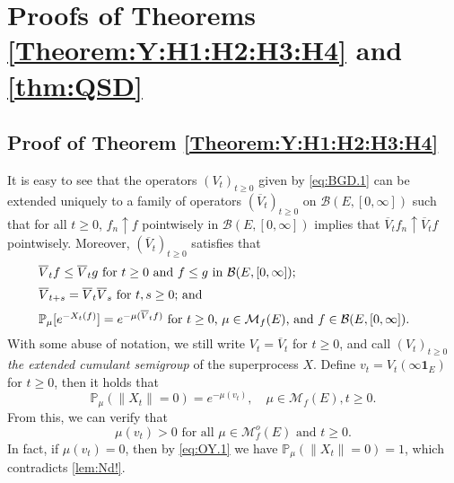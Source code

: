 \documentclass[12pt,a4paper]{amsart}
\numberwithin{equation}{section}
\theoremstyle{plain}
\theoremstyle{definition}
\theoremstyle{remark}
\begin{document}
\section{Proofs of Theorems \ref{Theorem:Y:H1:H2:H3:H4} and \ref{thm:QSD}} \label{sec:proofof thms}

\subsection{Proof of Theorem \ref{Theorem:Y:H1:H2:H3:H4}} \label{subsec:OY}
	It is easy to see that the operators $(V_t)_{t\geq 0}$
	given by \eqref{eq:BGD.1} can be extended uniquely to a family of operators $(\overline V_t)_{t\geq 0}$ on $\mathcal B(E,[0,\infty])$ such that for all $t\geq 0$, $f_n \uparrow f$ pointwisely in  $\mathcal B(E, [0,\infty])$ implies that $\overline V_tf_n \uparrow \overline V_tf$ pointwisely.
	Moreover, $(\overline V_t)_{t\geq 0}$ satisfies that
\begin{equation}
\begin{minipage}{0.9\textwidth}
	$\overline V_t f \leq \overline V_t g$ for $t\geq 0$ and $f\leq g$ in $\mathcal B(E,[0,\infty])$;
\end{minipage}\label{Fact:BV!}
\end{equation}
\begin{equation}
\begin{minipage}{0.9\textwidth}
	$\overline V_{t+s} = \overline V_t \overline V_s$ for $t, s\geq 0$;  and
\end{minipage} \label{eq:OY.0}
\end{equation}
\begin{equation}
\begin{minipage}{0.9\textwidth}
	$\mathbb P_\mu [e^{-X_t(f)}] = e^{- \mu(\overline V_tf)}$ for $t\geq 0$, $\mu \in \mathcal M_f(E)$, and $f\in \mathcal B(E,[0,\infty])$.
\end{minipage} \label{eq:BGD.2}
\end{equation}
	With some abuse of notation, we still write $V_t = \overline V_t$ for $t\geq 0$, and call $(V_t)_{t\geq 0}$ \emph{the extended cumulant semigroup} of the superprocess $X$.
	Define $v_t = V_t(\infty  \mathbf 1_E)$ for $t\geq 0$, then it holds that
\begin{equation} \label{eq:OY.1}
	\mathbb P_\mu (\|X_t\| = 0)
	= e^{- \mu (v_t)},
	\quad \mu \in \mathcal M_f(E), t\geq 0.
\end{equation}
	From this, we can verify that
\begin{equation}\label{lem:sv2!}
	\text{$\mu(v_t) > 0$ for all $\mu \in \mathcal M_f^o(E)$ and $t \geq 0$.}
\end{equation}
	In fact, if $\mu(v_t) = 0$, then by \eqref{eq:OY.1} we have $\mathbb P_\mu(\|X_t \| = 0) = 1$, which contradicts \eqref{lem:Nd!}.
\end{document}

